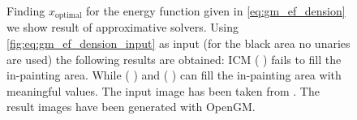 \begin{figure}[H]
    \centering
    \caption[Energy based truncated denoising]{
        Finding $x_{\text{optimal}} $ for the energy function given
        in \cref{eq:gm_ef_dension} we show result of approximative solvers.
        Using \cref{fig:eq:gm_ef_dension_input} as input (for the black area no unaries 
        are used)
        the following
        results are obtained: ICM \cite{TODO_ICM}  ( ) fails
        to fill the in-painting area. While \cite{TODO_TRWS}  ( ) 
        and \cite{TODO_ALPHA_E}  ( ) can fill the in-painting area
        with meaningful values.
        The input image has been taken from \citep{szeliski_2008_pami}.
        The result images have been generated with OpenGM.
    }\label{fig:gm_ef_denoise}
\end{figure}

